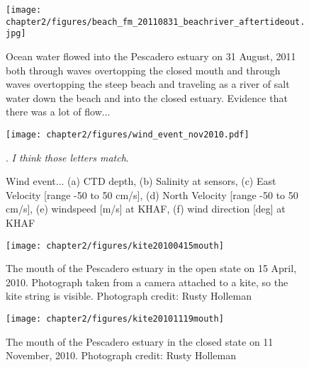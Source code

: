 {\begin{figure}
		\texttt{[image: chapter2/figures/beach\_fm\_20110831\_beachriver\_aftertideout.jpg]} \caption{Ocean water flowed into the Pescadero estuary on 31 August, 2011 both through waves overtopping the closed mouth and through waves overtopping the steep beach and traveling as a river of salt water down the beach and into the closed estuary. Evidence that there was a lot of flow...} \label{fig:beachriver_after} 
\end{figure}

\begin{figure}[t]
	\centering
	\texttt{[image: chapter2/figures/wind\_event\_nov2010.pdf]}
\caption{Wind event... (a) CTD depth, (b) Salinity at sensors, (c) East Velocity [range -50 to 50 cm/s], (d) North Velocity [range -50 to 50 cm/s], (e) windspeed [m/s] at KHAF, (f) wind direction [deg] at KHAF}. \emph{I think those letters match}.
\label{fig:closed_UVwindsalt}
\end{figure}

\begin{figure}
	\begin{center}
		\texttt{[image: chapter2/figures/kite20100415mouth]} 
	\end{center}
\caption{The mouth of the Pescadero estuary in the open state on 15 April, 2010. Photograph taken from a camera attached to a kite, so the kite string is visible. Photograph credit: Rusty Holleman}\label{fig:kite_photos} \end{figure}

\begin{figure}
	\begin{center}
		\texttt{[image: chapter2/figures/kite20101119mouth]} 
	\end{center}
\caption{The mouth of the Pescadero estuary in the closed state on 11 November, 2010.  Photograph credit: Rusty Holleman}\label{fig:kite_photos} \end{figure}


}
